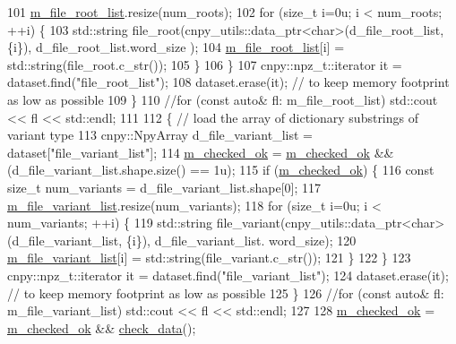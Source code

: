 \begin{DoxyCode}
101       \hyperlink{classlbann_1_1offline__patches__npz_a515ef05ef0679f3b6f1197d1ab47bfb3}{m\_file\_root\_list}.resize(num\_roots);
102       \textcolor{keywordflow}{for} (\textcolor{keywordtype}{size\_t} i=0u; i < num\_roots; ++i) \{
103         std::string file\_root(cnpy\_utils::data\_ptr<char>(d\_file\_root\_list, \{i\}), d\_file\_root\_list.word\_size
      );
104         \hyperlink{classlbann_1_1offline__patches__npz_a515ef05ef0679f3b6f1197d1ab47bfb3}{m\_file\_root\_list}[i] = std::string(file\_root.c\_str());
105       \}
106     \}
107     cnpy::npz\_t::iterator it = dataset.find(\textcolor{stringliteral}{"file\_root\_list"});
108     dataset.erase(it); \textcolor{comment}{// to keep memory footprint as low as possible}
109   \}
110   \textcolor{comment}{//for (const auto& fl: m\_file\_root\_list) std::cout << fl << std::endl;}
111 
112   \{ \textcolor{comment}{// load the array of dictionary substrings of variant type}
113     cnpy::NpyArray d\_file\_variant\_list = dataset[\textcolor{stringliteral}{"file\_variant\_list"}];
114     \hyperlink{classlbann_1_1offline__patches__npz_ab434320c2084790a2c99257d6c39fc85}{m\_checked\_ok} = \hyperlink{classlbann_1_1offline__patches__npz_ab434320c2084790a2c99257d6c39fc85}{m\_checked\_ok} && (d\_file\_variant\_list.shape.size() == 1u);
115     \textcolor{keywordflow}{if} (\hyperlink{classlbann_1_1offline__patches__npz_ab434320c2084790a2c99257d6c39fc85}{m\_checked\_ok}) \{
116       \textcolor{keyword}{const} \textcolor{keywordtype}{size\_t} num\_variants = d\_file\_variant\_list.shape[0];
117       \hyperlink{classlbann_1_1offline__patches__npz_a164d2bd134dc8c3946dc28d6ec5da0ec}{m\_file\_variant\_list}.resize(num\_variants);
118       \textcolor{keywordflow}{for} (\textcolor{keywordtype}{size\_t} i=0u; i < num\_variants; ++i) \{
119         std::string file\_variant(cnpy\_utils::data\_ptr<char>(d\_file\_variant\_list, \{i\}), d\_file\_variant\_list.
      word\_size);
120         \hyperlink{classlbann_1_1offline__patches__npz_a164d2bd134dc8c3946dc28d6ec5da0ec}{m\_file\_variant\_list}[i] = std::string(file\_variant.c\_str());
121       \}
122     \}
123     cnpy::npz\_t::iterator it = dataset.find(\textcolor{stringliteral}{"file\_variant\_list"});
124     dataset.erase(it); \textcolor{comment}{// to keep memory footprint as low as possible}
125   \}
126   \textcolor{comment}{//for (const auto& fl: m\_file\_variant\_list) std::cout << fl << std::endl;}
127 
128   \hyperlink{classlbann_1_1offline__patches__npz_ab434320c2084790a2c99257d6c39fc85}{m\_checked\_ok} = \hyperlink{classlbann_1_1offline__patches__npz_ab434320c2084790a2c99257d6c39fc85}{m\_checked\_ok} && \hyperlink{classlbann_1_1offline__patches__npz_a44d8cad35ff9ad245856c5408965e53b}{check\_data}();

\end{DoxyCode}
